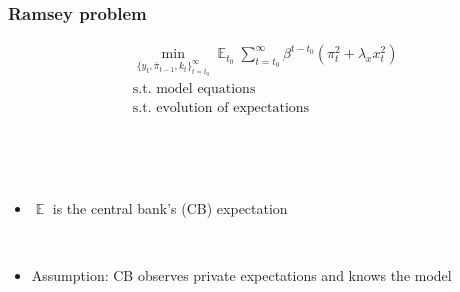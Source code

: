 \documentclass[10pt]{beamer}
\DeclareMathOperator{\E}{\mathbb{E}}
\begin{document}
\begin{frame}
	\frametitle{Ramsey problem}
	 \begin{align*}
& \min_{ \{y_t, \bar{\pi}_{t-1}, k_t \}_{t=t_0}^{\infty}} \E_{t_0}\sum_{t=t_0}^{\infty} \beta^{t-t_0} (\pi_t^2  + \lambda_x x_t^2 )  \\
& \text{s.t. model equations} \\
& \text{s.t. evolution of expectations} 
\end{align*}

\

\

\begin{itemize}
\item $\E$ is the central bank's (CB) expectation

\

\item Assumption: CB observes private expectations and knows the model

\end{itemize}

 

\end{frame}
\end{document}
